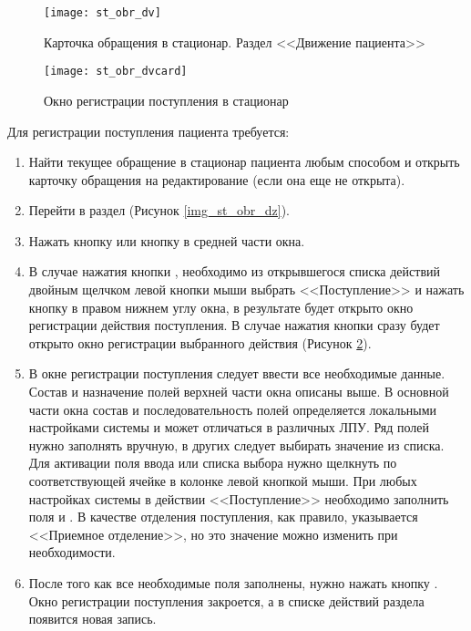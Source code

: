 \begin{figure}[ht]\centering
   \texttt{[image: st\_obr\_dv]}
   \caption{Карточка обращения в стационар. Раздел <<Движение пациента>>}
   \label{img_st_obr_dv}
\end{figure}

\begin{figure}[ht]\centering
   \texttt{[image: st\_obr\_dvcard]}
   \caption{Окно регистрации поступления в стационар}
   \label{img_st_obr_dvcard}
\end{figure}
  
Для регистрации поступления пациента требуется:
\begin{enumerate}
 \item Найти текущее обращение в стационар пациента любым способом и открыть карточку обращения на редактирование (если она еще не открыта).
 \item Перейти в раздел  (Рисунок \ref{img_st_obr_dz}).
 \item Нажать кнопку  или кнопку  в средней части окна.
 \item В случае нажатия кнопки  , необходимо из открывшегося списка действий двойным щелчком левой кнопки мыши выбрать <<Поступление>> и нажать кнопку  в правом нижнем углу окна, в результате будет открыто окно регистрации действия поступления. В случае нажатия кнопки   сразу будет открыто окно регистрации выбранного действия (Рисунок \ref{img_st_obr_dvcard}).
 \item В окне регистрации поступления следует ввести все необходимые данные. Состав и назначение полей верхней части окна описаны выше. В основной части окна состав и последовательность полей определяется локальными настройками системы и может отличаться в различных ЛПУ. Ряд полей нужно заполнять вручную, в других следует выбирать значение из списка. Для активации поля ввода или списка выбора нужно щелкнуть по соответствующей ячейке в колонке  левой кнопкой мыши. При любых настройках системы в действии <<Поступление>> необходимо заполнить поля  и . В качестве отделения поступления, как правило, указывается <<Приемное отделение>>, но это значение можно изменить при необходимости.
 \item После того как все необходимые поля заполнены, нужно нажать кнопку . Окно регистрации поступления закроется, а в списке действий раздела  появится новая запись.
\end{enumerate}


